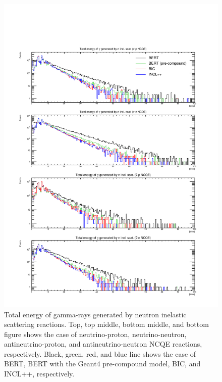 \begin{figure}[h]
	\centering
	\includegraphics[width=16cm]{PDF/Secondary/Comparison_PreCompound/gamma/pdf1/Logy_TotEneSec}
	\caption[Total energy of gamma-rays generated by neutron inelastic scattering reactions]{
	Total energy of gamma-rays generated by neutron inelastic scattering reactions.
	Top, top middle, bottom middle, and bottom figure shows the case of neutrino-proton, neutrino-neutron, antineutrino-proton, and antineutrino-neutron NCQE reactions, respectively.
	Black, green, red, and blue line shows the case of BERT, BERT with the Geant4 pre-compound model, BIC, and INCL++, respectively.
	}\label{Others_gamma_Logy_TotEneSec}
\end{figure}

